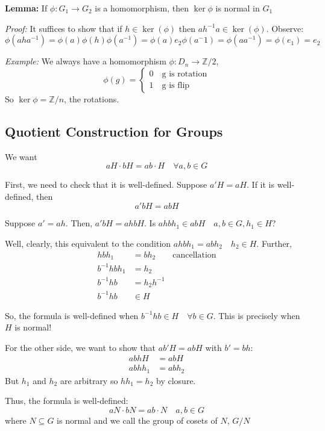 \documentclass[12pt]{report}
\newcommand{\Z}{\mathbb{Z}}
\begin{document}
        \textbf{Lemma:} If $\phi: G_1 \to G_2$ is a homomorphism, then $\ker \phi$ is normal in $G_1$

        \emph{Proof:} It suffices to show that if $h \in \ker(\phi)$ then $ah^{-1}a \in \ker(\phi)$. Observe:
        \[\phi(aha^{-1}) = \phi(a)\phi(h)\phi(a^{-1}) = \phi(a) e_2 \phi(a^-1) = \phi(aa^{-1}) = \phi(e_1) = e_2\]

        \emph{Example:} We always have a homomorphism $\phi: D_n \to \Z/2$,
            \[\phi(g) = \begin{cases}
                0 \quad \text{g is rotation}\\
                1 \quad \text{g is flip}
            \end{cases}\]
        So $\ker \phi = \Z/n$, the rotations. 

    \subsection*{Quotient Construction for Groups}
        We want 
        \[aH \cdot bH = ab \cdot H \quad \forall a,b \in G\] 

        First, we need to check that it is well-defined. Suppose $a'H = aH$. If it is well-defined, then 
        \[a'bH = ab H\]

        Suppose $a' = ah$. Then, $a'bH = ahb H$. Is $ahbh_1 \in abH \quad a,b \in G, h_1 \in H$? 

        Well, clearly, this equivalent to the condition $ahbh_1 = abh_2 \quad h_2 \in H$. Further, 
        \begin{align*}
            hbh_1 &= bh_2 \qquad \text{cancellation}\\
            b^{-1} hbh_1 &= h_2\\
            b^{-1}hb &= h_2h^{-1}\\
            b^{-1}hb &\in H
        \end{align*}

        So, the formula is well-defined when $b^{-1}hb \in H\quad \forall b\in G$. This is precisely when $H$ is normal!

        For the other side, we want to show that $ab'H = abH$ with $b'=bh$:
        \begin{align*}
            abhH &= abH\\
            abhh_1 &= abh_2
        \end{align*}
        But $h_1$ and $h_2$ are arbitrary so $hh_1 = h_2$ by closure. 

        Thus, the formula is well-defined:
        \[aN \cdot bN = ab \cdot N \quad a, b \in G\]
        where $N \subseteq G$ is normal
        and we call the group of cosets of $N$, $G/N$
\end{document}

